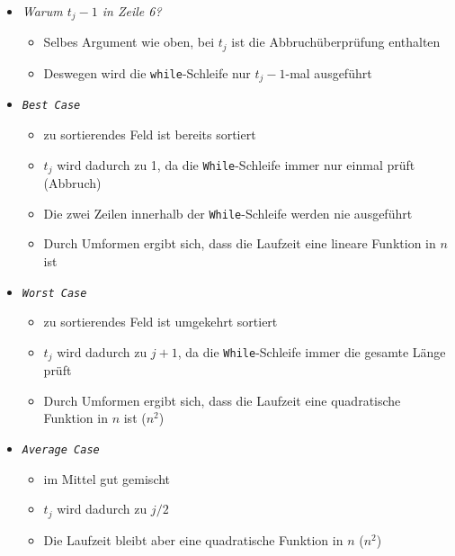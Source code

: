 \begin{itemize}
\begin{itemize}
                \item \textit{Warum $t_j-1$ in Zeile 6?}
                    \begin{itemize}
                        \item Selbes Argument wie oben, bei $t_j$ ist die Abbruchüberprüfung enthalten
                        \item Deswegen wird die \texttt{while}-Schleife nur $t_j-1$-mal ausgeführt
                    \end{itemize}
                
                \item \textit{\texttt{Best Case}}
                    \begin{itemize}
                        \item zu sortierendes Feld ist bereits sortiert 
                        \item $t_j$ wird dadurch zu 1, da die \texttt{While}-Schleife immer nur einmal prüft (Abbruch)
                        \item Die zwei Zeilen innerhalb der \texttt{While}-Schleife werden nie ausgeführt
                        \item Durch Umformen ergibt sich, dass die Laufzeit eine lineare Funktion in $n$ ist
                    \end{itemize}
                
                \item \textit{\texttt{Worst Case}}
                    \begin{itemize}
                        \item zu sortierendes Feld ist umgekehrt sortiert 
                        \item $t_j$ wird dadurch zu $j+1$, da die \texttt{While}-Schleife immer die gesamte Länge prüft
                        \item Durch Umformen ergibt sich, dass die Laufzeit eine quadratische Funktion in $n$ ist ($n^2$)
                    \end{itemize}
                
                \item \textit{\texttt{Average Case} }
                    \begin{itemize}
                        \item im Mittel gut gemischt 
                        \item $t_j$ wird dadurch zu $j/2$
                        \item Die Laufzeit bleibt aber eine quadratische Funktion in $n$ ($n^2$)
                    \end{itemize}
            \end{itemize}
        

\end{itemize}
